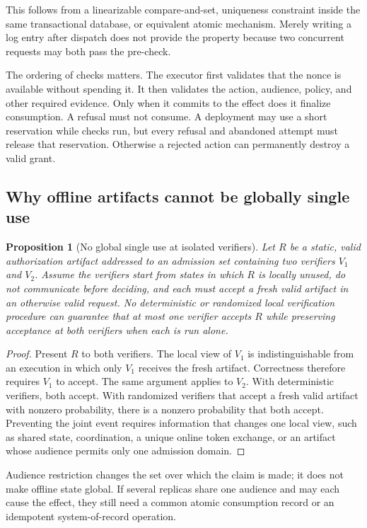\documentclass[10.5pt]{article}
\newtheorem{proposition}{Proposition}
\begin{document}
This follows from a linearizable compare-and-set, uniqueness constraint inside
the same transactional database, or equivalent atomic mechanism. Merely writing
a log entry after dispatch does not provide the property because two concurrent
requests may both pass the pre-check.

The ordering of checks matters. The executor first validates that the nonce is
available without spending it. It then validates the action, audience, policy,
and other required evidence. Only when it commits to the effect does it finalize
consumption. A refusal must not consume. A deployment may use a short reservation
while checks run, but every refusal and abandoned attempt must release that
reservation. Otherwise a rejected action can permanently destroy a valid grant.

\subsection{Why offline artifacts cannot be globally single use}

\begin{proposition}[No global single use at isolated verifiers]
Let $R$ be a static, valid authorization artifact addressed to an admission set
containing two verifiers $V_1$ and $V_2$. Assume the verifiers start from states
in which $R$ is locally unused, do not communicate before deciding, and each must
accept a fresh valid artifact in an otherwise valid request. No deterministic or
randomized local verification procedure can guarantee that at most one verifier
accepts $R$ while preserving acceptance at both verifiers when each is run alone.
\end{proposition}

\begin{proof}
Present $R$ to both verifiers. The local view of $V_1$ is indistinguishable from
an execution in which only $V_1$ receives the fresh artifact. Correctness
therefore requires $V_1$ to accept. The same argument applies to $V_2$. With
deterministic verifiers, both accept. With randomized verifiers that accept a
fresh valid artifact with nonzero probability, there is a nonzero probability
that both accept. Preventing the joint event requires information that changes
one local view, such as shared state, coordination, a unique online token
exchange, or an artifact whose audience permits only one admission domain.
\end{proof}

Audience restriction changes the set over which the claim is made; it does not
make offline state global. If several replicas share one audience and may each
cause the effect, they still need a common atomic consumption record or an
idempotent system-of-record operation.
\end{document}
